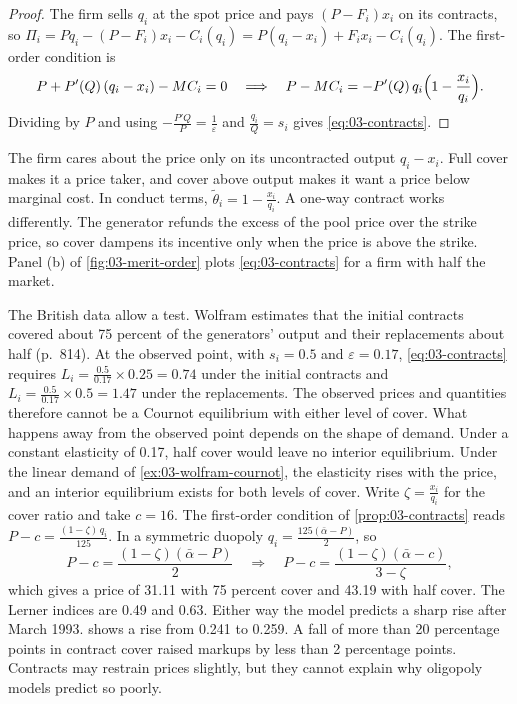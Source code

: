 \begin{proof}
The firm sells $q_i$ at the spot price and pays $(P - F_i)x_i$ on its contracts, so
$\Pi_i = P q_i - (P - F_i)x_i - C_i(q_i) = P(q_i - x_i) + F_i x_i - C_i(q_i)$. The first-order condition is
\begin{equation*}
P + P'(Q)\,(q_i - x_i) - MC_i = 0
\quad\Longrightarrow\quad
P - MC_i = -P'(Q)\, q_i\Bigl(1 - \frac{x_i}{q_i}\Bigr).
\end{equation*}
Dividing by $P$ and using $-\frac{P' Q}{P} = \frac{1}{\varepsilon}$ and $\frac{q_i}{Q} = s_i$ gives
\eqref{eq:03-contracts}.
\end{proof}

The firm cares about the price only on its uncontracted output $q_i - x_i$. Full cover makes it a price taker, and
cover above output makes it want a price below marginal cost. In conduct terms, $\tilde\theta_i = 1 - \frac{x_i}{q_i}$.
A one-way contract works differently. The generator refunds the excess of the pool price over the strike price, so cover
dampens its incentive only when the price is above the strike. Panel (b) of \cref{fig:03-merit-order} plots
\eqref{eq:03-contracts} for a firm with half the market.

The British data allow a test. Wolfram estimates that the initial contracts covered about 75 percent of the generators'
output and their replacements about half (p.~814). At the observed point, with $s_i = 0.5$ and $\varepsilon = 0.17$,
\eqref{eq:03-contracts} requires $L_i = \frac{0.5}{0.17}\times 0.25 = 0.74$ under the initial contracts and
$L_i = \frac{0.5}{0.17}\times 0.5 = 1.47$ under the replacements. The observed prices and quantities therefore cannot
be a Cournot equilibrium with either level of cover. What happens away from the observed point depends on the shape of
demand. Under a constant elasticity of 0.17, half cover would leave no interior equilibrium. Under the linear demand
of \cref{ex:03-wolfram-cournot}, the elasticity rises with the price, and an interior equilibrium exists for both
levels of cover. Write $\zeta = \frac{x_i}{q_i}$ for the cover ratio and take $c = 16$. The first-order condition
of \cref{prop:03-contracts} reads $P - c = \frac{(1 - \zeta)\, q_i}{125}$. In a symmetric duopoly
$q_i = \frac{125(\bar\alpha - P)}{2}$, so
\begin{equation*}
P - c = \frac{(1 - \zeta)(\bar\alpha - P)}{2}
\quad\Longrightarrow\quad
P - c = \frac{(1 - \zeta)(\bar\alpha - c)}{3 - \zeta},
\end{equation*}
which gives a price of 31.11 with 75 percent cover and 43.19 with half cover. The Lerner indices are 0.49 and 0.63. Either
way the model predicts a sharp rise after March 1993.  shows a rise from 0.241 to 0.259. A
fall of more than 20 percentage points in contract cover raised markups by less than 2 percentage points. Contracts
may restrain prices slightly, but they cannot explain why oligopoly models predict so poorly.


